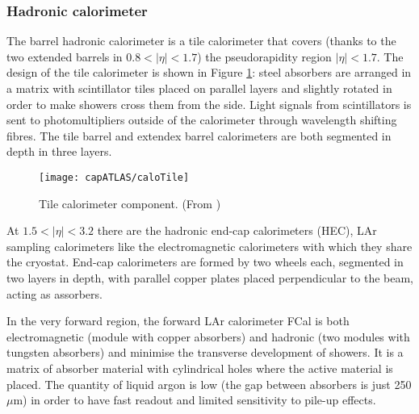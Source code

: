 \subsubsection{Hadronic calorimeter}
The barrel hadronic calorimeter is a tile calorimeter that covers (thanks to the two extended barrels in $0.8<|\eta|< 1.7$) the pseudorapidity region $|\eta|< 1.7$. The design of the tile calorimeter is shown in Figure \ref{caloTile}: steel absorbers are arranged in a matrix with scintillator tiles placed on parallel layers and slightly rotated in order to make showers cross them from the side. Light signals from scintillators is sent to photomultipliers outside of the calorimeter through wavelength shifting fibres. The tile barrel and extendex barrel calorimeters are both segmented in depth in three layers.

\begin{figure}[hbt]\begin{center}
\texttt{[image: capATLAS/caloTile]}\caption{Tile calorimeter component. (From \cite{Aad:JINST})}\label{caloTile}
\end{center}\end{figure}

At $1.5<|\eta|<3.2$ there are the hadronic end-cap calorimeters (HEC), LAr sampling calorimeters like the electromagnetic calorimeters with which they share the cryostat. End-cap calorimeters are formed by two wheels each, segmented in two layers in depth, with parallel copper plates placed perpendicular to the beam, acting as assorbers.

In the very forward region, the forward LAr calorimeter FCal is both electromagnetic (module with copper absorbers) and hadronic (two modules with tungsten absorbers) and minimise the transverse development of showers. It is a matrix of absorber material with cylindrical holes where the active material is placed. The quantity of liquid argon is low (the gap between absorbers is just 250 $\mu$m) in order to have fast readout and limited sensitivity to pile-up effects.


